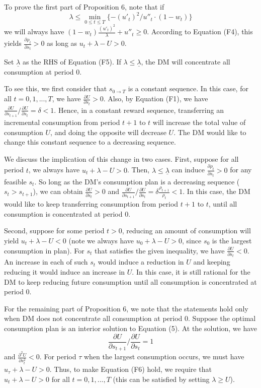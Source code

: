 To prove the first part of Proposition 6, note that if\[\tag{F5}
\lambda\leq \min_{0 \leq t \leq T} \{-(u'_t)^2/u''_t \cdot(1-w_t)\}
\]we will always have \((1-w_t)\frac{(u'_t)^2}{\lambda}+u''_t \geq 0\).
According to Equation (F4), this yields
\(\frac{\partial \rho_t}{\partial s_t}>0\) as long as
\(u_t+\lambda-U>0\).

Set \(\underline{\lambda}\) as the RHS of Equation (F5). If
\(\lambda\leq \underline{\lambda}\), the DM will concentrate all
consumption at period 0.

To see this, we first consider that \(s_{0\rightarrow T}\) is a constant
sequence. In this case, for all \(t=0,1,...,T\), we have
\(\frac{\partial U}{\partial s_t}>0\). Also, by Equation (F1), we have
\(\frac{\partial U}{\partial s_{t+1}}/\frac{\partial U}{\partial s_{t}}=\delta<1\).
Hence, in a constant reward sequence, transferring an incremental
consumption from period \(t+1\) to \(t\) will increase the total value
of consumption \(U\), and doing the opposite will decrease \(U\). The DM
would like to change this constant sequence to a decreasing sequence.

We discuss the implication of this change in two cases. First, suppose
for all period \(t\), we always have \(u_t+\lambda-U>0\). Then,
\(\lambda \leq \underline{\lambda}\) can induce
\(\frac{\partial \rho_t}{\partial s_t}>0\) for any feasible \(s_t\). So
long as the DM's consumption plan is a decreasing sequence
(\(s_t>s_{t+1}\)), we can obtain \(\frac{\partial U}{\partial s_t}>0\)
and
\(\frac{\partial U}{\partial s_{t+1}}/\frac{\partial U}{\partial s_{t}}=\delta\frac{\rho_{t+1}}{\rho_{t}}<1\).
In this case, the DM would like to keep transferring consumption from
period \(t+1\) to \(t\), until all consumption is concentrated at period
0.

Second, suppose for some period \(t>0\), reducing an amount of
consumption will yield \(u_t+\lambda-U< 0\) (note we always have
\(u_0+\lambda-U>0\), since \(s_0\) is the largest consumption in plan).
For \(s_t\) that satisfies the given inequality, we have
\(\frac{\partial U}{\partial s_t}<0\). An increase in each of such
\(s_t\) would induce a reduction in \(U\) and keeping reducing it would
induce an increase in \(U\). In this case, it is still rational for the
DM to keep reducing future consumption until all consumption is
concentrated at period 0.

For the remaining part of Proposition 6, we note that the statements
hold only when DM does not concentrate all consumption at period 0.
Suppose the optimal consumption plan is an interior solution to Equation
(5). At the solution, we have\[\tag{F6}
\frac{\partial U}{\partial s_{t+1}}/\frac{\partial U}{\partial s_{t}}=1
\]and \(\frac{\partial^2 U}{\partial s_t^2}<0\). For period \(\tau\)
when the largest consumption occurs, we must have
\(u_\tau +\lambda - U>0\). Thus, to make Equation (F6) hold, we require
that \(u_t +\lambda - U>0\) for all \(t=0,1,...,T\) (this can be
satisfied by setting \(\lambda \geq U\)).

